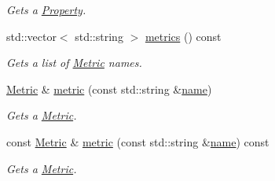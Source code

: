 \begin{DoxyCompactItemize}
\begin{DoxyCompactList}\small\item\em Gets a \hyperlink{classdg_1_1deepcore_1_1_property}{Property}. \end{DoxyCompactList}\item 
std\+::vector$<$ std\+::string $>$ \hyperlink{classdg_1_1deepcore_1_1_node_a27e97304bbd6a18baec9c4a08bad1dd3}{metrics} () const 
\begin{DoxyCompactList}\small\item\em Gets a list of \hyperlink{classdg_1_1deepcore_1_1_metric}{Metric} names. \end{DoxyCompactList}\item 
\hyperlink{classdg_1_1deepcore_1_1_metric}{Metric} \& \hyperlink{classdg_1_1deepcore_1_1_node_a9142212348d2d4e2849dc81f745d0d53}{metric} (const std\+::string \&\hyperlink{classdg_1_1deepcore_1_1_named_object_ab1379a28467dd39a81ceb02cf50dedde}{name})
\begin{DoxyCompactList}\small\item\em Gets a \hyperlink{classdg_1_1deepcore_1_1_metric}{Metric}. \end{DoxyCompactList}\item 
const \hyperlink{classdg_1_1deepcore_1_1_metric}{Metric} \& \hyperlink{classdg_1_1deepcore_1_1_node_af754575f3f03e6d247efee6e8bc6dcb4}{metric} (const std\+::string \&\hyperlink{classdg_1_1deepcore_1_1_named_object_ab1379a28467dd39a81ceb02cf50dedde}{name}) const 
\begin{DoxyCompactList}\small\item\em Gets a \hyperlink{classdg_1_1deepcore_1_1_metric}{Metric}. \end{DoxyCompactList}\end{DoxyCompactItemize}
